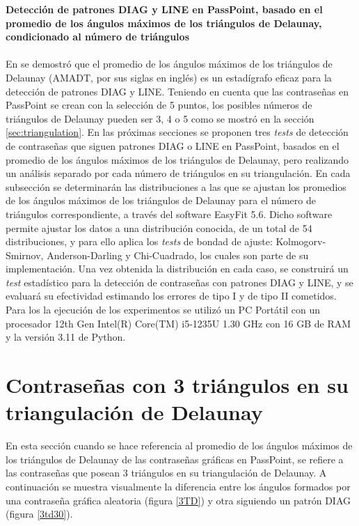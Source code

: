 \documentclass[12pt]{report}
\begin{document}
\vspace{-2em} %

\noindent\textbf{\LARGE Detección de patrones DIAG y LINE en PassPoint, basado en el promedio de los ángulos máximos de los triángulos de Delaunay, condicionado al número de triángulos}\\
\vspace{2em}
\\	
En \cite{13} se demostró que el promedio de los ángulos máximos de los triángulos de Delaunay (AMADT, por sus siglas en inglés) es un estadígrafo eficaz para la detección de patrones DIAG y LINE. Teniendo en cuenta que las contraseñas en PassPoint se crean con la selección de 5 puntos, los posibles números de triángulos de Delaunay pueden ser 3, 4 o 5 como se mostró en la sección \ref{sec:triangulation}. En las próximas secciones se proponen tres \textit{tests} de detección de contraseñas  que siguen patrones DIAG o LINE en PassPoint, basados en el promedio de los ángulos  máximos de los triángulos de Delaunay, pero  realizando un análisis separado por cada número de triángulos en su triangulación.
En cada subsección se determinarán las distribuciones a las que se ajustan los promedios de los ángulos máximos de los triángulos de Delaunay para el número de triángulos correspondiente, a través  del software EasyFit 5.6. Dicho software permite ajustar los datos a una distribución conocida, de un total de 54 distribuciones, y para ello aplica los \textit{tests} de bondad de ajuste: Kolmogorv-Smirnov, Anderson-Darling y Chi-Cuadrado, los cuales son parte de su implementación. 
Una vez obtenida la distribución en cada caso, se construirá un \textit{test} estadístico para la detección de contraseñas con patrones DIAG y LINE, y se evaluará su efectividad estimando los errores de  tipo I y de tipo II cometidos. Para los la ejecución de los experimentos se utilizó un PC Portátil con un procesador  12th Gen Intel(R) Core(TM) i5-1235U  1.30 GHz  con 16 GB de RAM y la versión 3.11 de Python.



\setcounter{section}{0}
\section{Contraseñas con 3 triángulos en su triangulación de Delaunay }
\label{sec:1}
En esta sección cuando se hace referencia  al promedio de los ángulos máximos de los triángulos de Delaunay  de las contraseñas gráficas en PassPoint, se refiere a las contraseñas que posean 3 triángulos en su triangulación de Delaunay. A continuación se muestra visualmente la diferencia entre los ángulos formados por una contraseña gráfica aleatoria (figura \ref{3TD}) y otra siguiendo un patrón DIAG (figura \ref{3td30}).
\newpage
	
\end{document}
